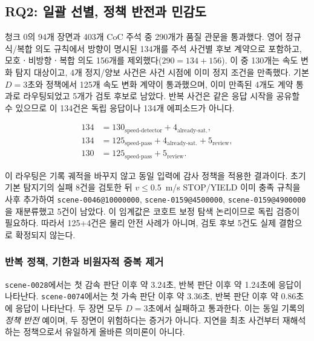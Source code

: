 \subsection{RQ2: 일괄 선별, 정책 반전과 민감도}
\label{sec:results-rq2}

청크 0의 94개 장면과 403개 CoC 주석 중 290개가 품질 관문을 통과했다. 영어 정규식/복합 의도 규칙에서 방향이 명시된 134개를 주석 사건별 후보 계약으로 포함하고, 모호ㆍ비방향ㆍ복합 의도 156개를 제외했다($290=134+156$). 이 중 130개는 속도 변화 탐지 대상이고, 4개 정지/양보 사건은 사건 시점에 이미 정지 조건을 만족했다. 기본 $D=3$초와 \preserve 정책에서 125개 속도 변화 계약이 통과했으며, 이미 만족된 4개도 계약 통과로 라우팅되었고 5개가 검토 후보로 남았다. 반복 사건은 같은 응답 시작을 공유할 수 있으므로 이 134건은 독립 응답이나 134개 에피소드가 아니다.

\begin{align}
134 &= 130_{\mathrm{speed\text{-}detector}} + 4_{\mathrm{already\text{-}sat.}}, \\
134 &= 125_{\mathrm{speed\text{-}pass}}
     + 4_{\mathrm{already\text{-}sat.}}
     + 5_{\mathrm{review}},\\
130 &= 125_{\mathrm{speed\text{-}pass}} + 5_{\mathrm{review}} .
\label{eq:cohort-counts}
\end{align}

이 라우팅은 기록 궤적을 바꾸지 않고 동일 입력에 감사 정책을 적용한 결과이다. 초기 기본 탐지기의 실패 8건을 검토한 뒤 $v\leq0.5$~m/s STOP/YIELD 이미 충족 규칙을 사후 추가하여 \texttt{scene-0046@10000000}, \texttt{scene-0159@4500000}, \texttt{scene-0159@4900000}을 재분류했고 5건이 남았다. 이 임계값은 코호트 보정 탐색 논리이므로 독립 검증이 필요하다. 따라서 125+4건은 물리 안전 사례가 아니며, 검토 후보 5건도 실제 결함으로 확정되지 않는다.

\subsubsection{반복 정책, 기한과 비원자적 중복 제거}

\texttt{scene-0028}에서는 첫 감속 판단 이후 약 3.24초, 반복 판단 이후 약 1.24초에 응답이 나타난다. \texttt{scene-0074}에서는 첫 가속 판단 이후 약 3.36초, 반복 판단 이후 약 0.86초에 응답이 나타난다. 두 장면 모두 $D=3$초에서  실패하고  통과한다. 이는 동일 기록의 \emph{정책 반전} 예이며, 두 장면이 위험하다는 증거가 아니다.  지연을 최초 사건부터 재해석하는 정책으로서 유일하게 올바른 의미론이 아니다.


